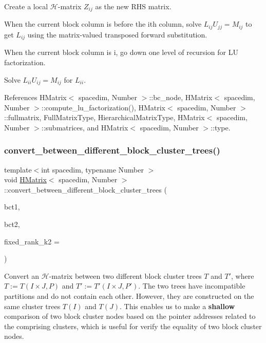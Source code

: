 Create a local $\mathcal{H}$-\/matrix $Z_{ij}$ as the new R\+HS matrix.

When the current block column is before the i\textquotesingle{}th column, solve $L_{ij} U_{jj}=M_{ij}$ to get $L_{ij}$ using the matrix-\/valued transposed forward substitution.

When the current block column is i, go down one level of recursion for LU factorization.

Solve $L_{ii}U_{ij}=M_{ij}$ for $L_{ii}$.

References H\+Matrix$<$ spacedim, Number $>$\+::bc\+\_\+node, H\+Matrix$<$ spacedim, Number $>$\+::compute\+\_\+lu\+\_\+factorization(), H\+Matrix$<$ spacedim, Number $>$\+::fullmatrix, Full\+Matrix\+Type, Hierarchical\+Matrix\+Type, H\+Matrix$<$ spacedim, Number $>$\+::submatrices, and H\+Matrix$<$ spacedim, Number $>$\+::type.

\mbox{\label{classHMatrix_af6fd60090b0de7bdea52fc84ddeb22c3}} 
\subsubsection{\texorpdfstring{convert\+\_\+between\+\_\+different\+\_\+block\+\_\+cluster\+\_\+trees()}{convert\_between\_different\_block\_cluster\_trees()}}
{\footnotesize\ttfamily template$<$int spacedim, typename Number $>$ \\
void \hyperlink{classHMatrix}{H\+Matrix}$<$ spacedim, Number $>$\+::convert\+\_\+between\+\_\+different\+\_\+block\+\_\+cluster\+\_\+trees (\begin{DoxyParamCaption}\item[{\hyperlink{classBlockClusterTree}{Block\+Cluster\+Tree}$<$ spacedim, Number $>$ \&}]{bct1,  }\item[{\hyperlink{classBlockClusterTree}{Block\+Cluster\+Tree}$<$ spacedim, Number $>$ \&}]{bct2,  }\item[{const unsigned int}]{fixed\+\_\+rank\+\_\+k2 = {} }\end{DoxyParamCaption})}

Convert an $\mathcal{H}$-\/matrix between two different block cluster trees $T$ and $T'$, where $T := T(I \times J, P)$ and $T' := T'(I \times J, P')$. The two trees have incompatible partitions and do not contain each other. However, they are constructed on the same cluster trees $T(I)$ and $T(J)$. This enables us to make a {\bfseries shallow} comparison of two block cluster nodes based on the pointer addresses related to the comprising clusters, which is useful for verify the equality of two block cluster nodes.

